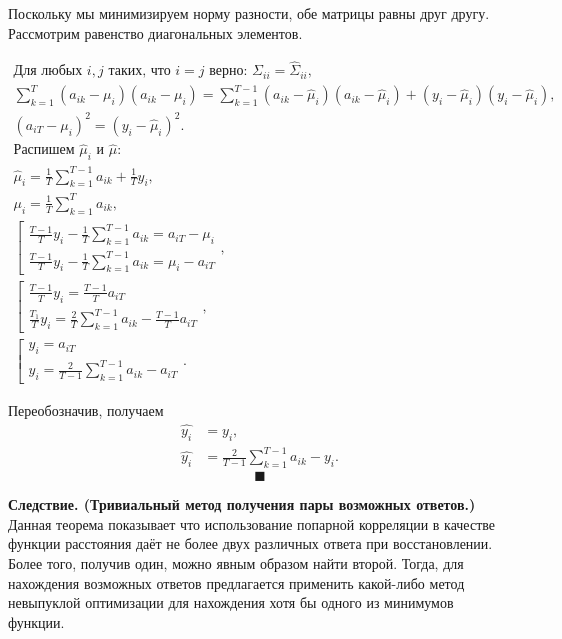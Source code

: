 \documentclass{article}
\begin{document}
Поскольку мы минимизируем норму разности, обе матрицы равны друг другу. Рассмотрим равенство диагональных элементов.

\begin{gather*}
	\text{Для любых } i, j \text{ таких, что } i = j \text{ верно: } \Sigma_{ii} = \hat{\Sigma}_{ii},\\
	\sum_{k=1}^{T}(a_{ik} - \mu_i)(a_{ik}-\mu_i) = \sum_{k=1}^{T-1}(a_{ik} - \hat{\mu}_i)(a_{ik}-\hat{\mu}_i) + (y_i - \hat{\mu}_i)(y_i - \hat{\mu}_i),\\
	(a_{iT}-\mu_i)^2 = (y_i-\hat{\mu}_i)^2.\\
	\text{Распишем } \hat{\mu}_i \text{ и } \hat{\mu}:\\
	\hat{\mu}_i = \frac{1}{T}\sum_{k=1}^{T-1}a_{ik} + \frac{1}{T}y_i,\\
	\mu_i = \frac{1}{T}\sum_{k=1}^{T}a_{ik},\\
	\left[
	\begin{array}{ll}
		\frac{T-1}{T}y_i-\frac{1}{T}\sum_{k=1}^{T-1}a_{ik}=a_{iT}-\mu_i
		\\[1ex]
		\frac{T-1}{T}y_i-\frac{1}{T}\sum_{k=1}^{T-1}a_{ik}=\mu_i-a_{iT}
	\end{array},
	\right .\\[1ex]
	\left[
	\begin{array}{ll}
		\frac{T-1}{T}y_i = \frac{T-1}{T}a_{iT}
		\\[1ex]
		\frac{T_1}{T}y_i = \frac{2}{T} \sum_{k=1}^{T-1} a_{ik} - \frac{T-1}{T}a_{iT}
	\end{array},
	\right .\\[1ex]
	\left[
	\begin{array}{ll}
		y_i = a_{iT}
		\\[1ex]
		y_i = \frac{2}{T-1} \sum_{k=1}^{T-1} a_{ik} - a_{iT}
	\end{array}.
	\right .
\end{gather*}

Переобозначив, получаем
\begin{align*}
	\hat{y_i} &= y_i,\\
	\hat{y_i} &= \frac{2}{T-1} \sum_{k=1}^{T-1} a_{ik} - y_i.
\end{align*}
$$ \blacksquare $$

\textbf{Следствие. (Тривиальный метод получения пары возможных ответов.)} Данная теорема показывает что использование попарной корреляции в качестве функции расстояния даёт не более двух различных ответа при восстановлении. Более того, получив один, можно явным образом найти второй. Тогда, для нахождения возможных ответов предлагается применить какой-либо метод невыпуклой оптимизации для нахождения хотя бы одного из минимумов функции.
\end{document}

